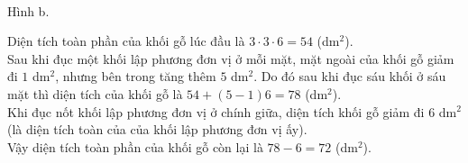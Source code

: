 \begin{bt}
{\begin{center}
\begin{multicols}{2}
\\
				Hình b.
			\end{multicols}
		\end{center}
		Diện tích toàn phần của khối gỗ lúc đầu là $3\cdot 3\cdot 6=54$ (dm$^2$).\\
		Sau khi đục một khối lập phương đơn vị ở mỗi mặt, mặt ngoài của khối gỗ giảm đi $1$ dm$^2$, nhưng bên trong tăng thêm $5$ dm$^2$. Do đó sau khi đục sáu khối ở sáu mặt thì diện tích của khối gỗ là $54+(5-1)6=78$ (dm$^2$).\\
		Khi đục nốt khối lập phương đơn vị ở chính giữa, diện tích khối gỗ giảm đi $6$ dm$^2$ (là diện tích toàn của của khối lập phương đơn vị ấy).\\
		Vậy diện tích toàn phần của khối gỗ còn lại là $78-6=72$ (dm$^2$).
	}
\end{bt}
